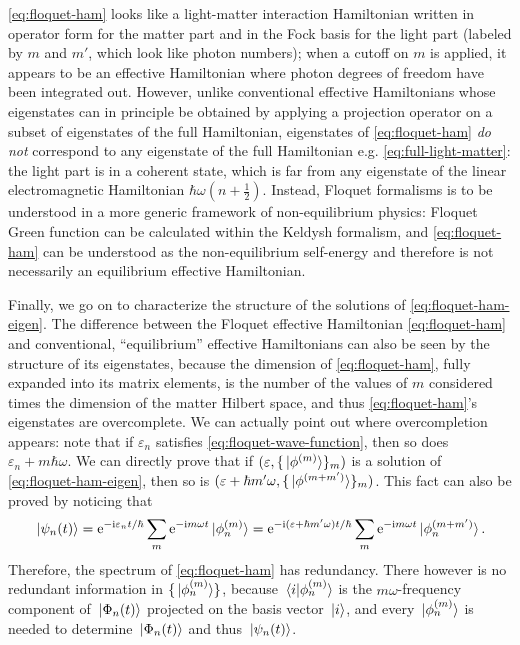 \documentclass[hyperref, a4paper]{article}
\newcommand*{\ii}{\mathrm{i}}
\newcommand*{\ee}{\mathrm{e}}
\begin{document}
\eqref{eq:floquet-ham} looks like a light-matter interaction Hamiltonian 
written in operator form for the matter part 
and in the Fock basis for the light part (labeled by $m$ and $m'$, which look like photon numbers);
when a cutoff on $m$ is applied, 
it appears to be an effective Hamiltonian where photon degrees of freedom 
have been integrated out.
However, unlike conventional effective Hamiltonians
whose eigenstates can in principle be obtained by 
applying a projection operator on a subset of eigenstates of the full Hamiltonian,
eigenstates of \eqref{eq:floquet-ham} 
\emph{do not} correspond to any eigenstate of 
the full Hamiltonian e.g. \eqref{eq:full-light-matter}:
the light part is in a coherent state,
which is far from any eigenstate of the linear electromagnetic Hamiltonian $\hbar \omega (n + \frac{1}{2})$.
Instead, Floquet formalisms is to be understood in a more generic framework of non-equilibrium physics:
Floquet Green function can be calculated within the Keldysh formalism,
and \eqref{eq:floquet-ham} can be understood as the 
non-equilibrium self-energy \cite{lubatsch2019evolution,aoki2014nonequilibrium}
and therefore is not necessarily an equilibrium effective Hamiltonian.

Finally, we go on to characterize the structure of the solutions of  \eqref{eq:floquet-ham-eigen}.
The difference between the Floquet effective Hamiltonian \eqref{eq:floquet-ham}
and conventional, ``equilibrium'' effective Hamiltonians can also be seen  
by the structure of its eigenstates, 
because the dimension of \eqref{eq:floquet-ham}, fully expanded into its matrix elements,
is the number of the values of $m$ considered 
times the dimension of the matter Hilbert space,
and thus \eqref{eq:floquet-ham}'s eigenstates are overcomplete.
We can actually point out where overcompletion appears:
note that if $\varepsilon_n$ satisfies \eqref{eq:floquet-wave-function},
then so does $\varepsilon_n + m \hbar \omega$.
We can directly prove that if $(\varepsilon, \{\ket*{\phi^{(m)}}\}_m)$ 
is a solution of \eqref{eq:floquet-ham-eigen},
then so is $(\varepsilon + \hbar m' \omega, \{\ket*{\phi^{(m + m')}}\}_m)$.
This fact can also be proved by noticing that  
\begin{equation}
    \ket*{\psi_n(t)} = \ee^{- \ii \varepsilon_n t / \hbar} \sum_m \ee^{- \ii m \omega t} \ket*{\phi_n^{(m)}}
    = \ee^{- \ii (\varepsilon + \hbar m' \omega) t / \hbar}
    \sum_m \ee^{- \ii m \omega t} \ket*{\phi_n^{(m + m')}}.
\end{equation}
Therefore, the spectrum of \eqref{eq:floquet-ham} has redundancy. 
There however is no redundant information in $\{\ket*{\phi_n^{(m)}}\}$,
because $\braket*{i}{\phi_n^{(m)}}$ is the 
$m \omega$-frequency component of $\ket*{\Phi_n(t)}$
projected on the basis vector $\ket*{i}$,
and every $\ket*{\phi_n^{(m)}}$ is needed to determine $\ket*{\Phi_n(t)}$
and thus $\ket*{\psi_n(t)}$.
\end{document}
